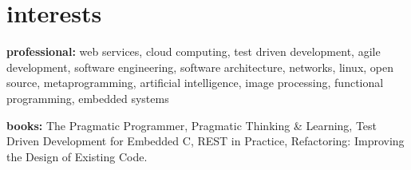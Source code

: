\documentclass[]{friggeri-cv} %
\begin{document}

\section{interests}

\textbf{professional:} web services, cloud computing, test driven development, agile development, software engineering, software architecture, networks, linux, open source, metaprogramming, artificial intelligence, image processing, functional programming, embedded systems

\textbf{books:} The Pragmatic Programmer, Pragmatic Thinking \& Learning, Test Driven Development for Embedded C, REST in Practice, Refactoring: Improving the Design of Existing Code.
\end{document}
